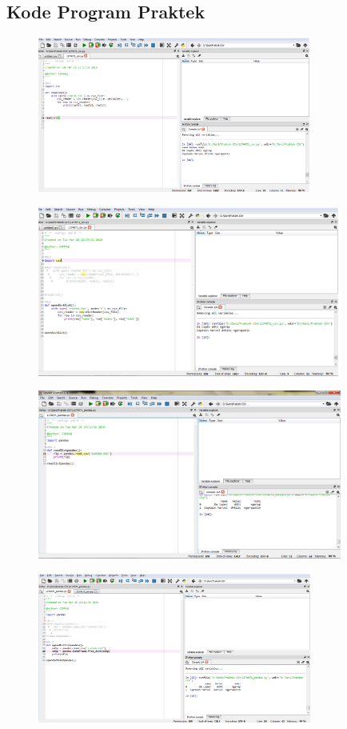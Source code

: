 \subsection{Kode Program Praktek}
\begin{figure}[ht]
	\includegraphics[width=9cm]{figures/4/1174071/Praktek/1174071_csv1.png}
	\centering
\end{figure}
\begin{figure}[ht]
	\includegraphics[width=10cm]{figures/4/1174071/Praktek/1174071_csv2.png}
	\centering
\end{figure}
\begin{figure}[ht]
	\includegraphics[width=10cm]{figures/4/1174071/Praktek/1174071_pandas3.png}
	\centering
\end{figure}
\begin{figure}[ht]
	\includegraphics[width=9cm]{figures/4/1174071/Praktek/1174071_pandas4.png}
	\centering
\end{figure}
